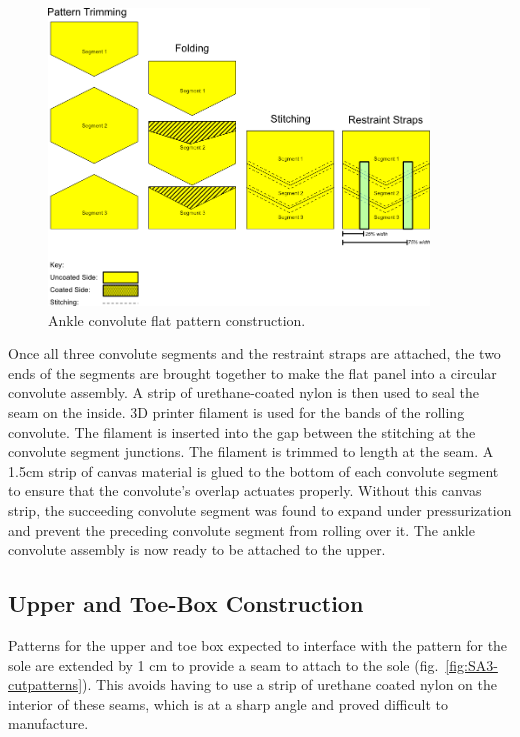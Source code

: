 \documentclass[defaultstyle,11pt]{comps}
\begin{document}
\begin{figure}
\hypertarget{fig:SA3-convoluteflat}{%
\centering
\includegraphics[width=0.9\textwidth,height=\textheight]{../fig/SA3/ConvoluteConstruction.png}
\caption{Ankle convolute flat pattern construction.}\label{fig:SA3-convoluteflat}
}
\end{figure}

Once all three convolute segments and the restraint straps are attached, the two ends of the segments are brought together to make the flat panel into a circular convolute assembly.
A strip of urethane-coated nylon is then used to seal the seam on the inside.
3D printer filament is used for the bands of the rolling convolute.
The filament is inserted into the gap between the stitching at the convolute segment junctions.
The filament is trimmed to length at the seam.
A 1.5cm strip of canvas material is glued to the bottom of each convolute segment to ensure that the convolute's overlap actuates properly.
Without this canvas strip, the succeeding convolute segment was found to expand under pressurization and prevent the preceding convolute segment from rolling over it.
The ankle convolute assembly is now ready to be attached to the upper.

\hypertarget{upper-and-toe-box-construction}{%
\subsection{Upper and Toe-Box Construction}\label{upper-and-toe-box-construction}}

Patterns for the upper and toe box expected to interface with the pattern for the sole are extended by 1 cm to provide a seam to attach to the sole (fig.~\ref{fig:SA3-cutpatterns}).
This avoids having to use a strip of urethane coated nylon on the interior of these seams, which is at a sharp angle and proved difficult to manufacture.
\end{document}
